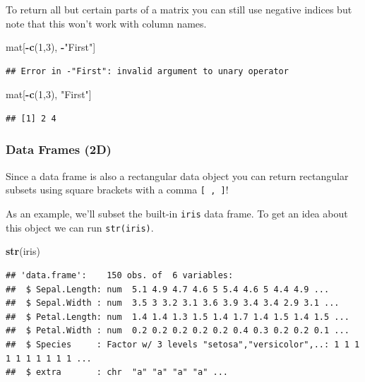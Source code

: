 \documentclass[
]{book}
\newenvironment{Shaded}{\begin{snugshade}}{\end{snugshade}}
\newcommand{\DecValTok}[1]{\textcolor[rgb]{0.00,0.00,0.81}{#1}}
\newcommand{\KeywordTok}[1]{\textcolor[rgb]{0.13,0.29,0.53}{\textbf{#1}}}
\newcommand{\NormalTok}[1]{#1}
\newcommand{\OperatorTok}[1]{\textcolor[rgb]{0.81,0.36,0.00}{\textbf{#1}}}
\newcommand{\StringTok}[1]{\textcolor[rgb]{0.31,0.60,0.02}{#1}}
\theoremstyle{definition}
\theoremstyle{definition}
\theoremstyle{definition}
\theoremstyle{remark}
\begin{document}
To return all but certain parts of a matrix you can still use negative indices but note that this won't work with column names.

\begin{Shaded}
\begin{Highlighting}[]
\NormalTok{mat[}\OperatorTok{-}\KeywordTok{c}\NormalTok{(}\DecValTok{1}\NormalTok{,}\DecValTok{3}\NormalTok{), }\OperatorTok{-}\StringTok{"First"}\NormalTok{]}
\end{Highlighting}
\end{Shaded}

\begin{verbatim}
## Error in -"First": invalid argument to unary operator
\end{verbatim}

\begin{Shaded}
\begin{Highlighting}[]
\NormalTok{mat[}\OperatorTok{-}\KeywordTok{c}\NormalTok{(}\DecValTok{1}\NormalTok{,}\DecValTok{3}\NormalTok{), }\StringTok{"First"}\NormalTok{]}
\end{Highlighting}
\end{Shaded}

\begin{verbatim}
## [1] 2 4
\end{verbatim}

\hypertarget{data-frames-2d-1}{%
\subsubsection{Data Frames (2D)}\label{data-frames-2d-1}}

Since a data frame is also a rectangular data object you can return rectangular subsets using square brackets with a comma \texttt{{[}\ ,\ {]}}!

As an example, we'll subset the built-in \texttt{iris} data frame. To get an idea about this object we can run \texttt{str(iris)}.

\begin{Shaded}
\begin{Highlighting}[]
\KeywordTok{str}\NormalTok{(iris)}
\end{Highlighting}
\end{Shaded}

\begin{verbatim}
## 'data.frame':    150 obs. of  6 variables:
##  $ Sepal.Length: num  5.1 4.9 4.7 4.6 5 5.4 4.6 5 4.4 4.9 ...
##  $ Sepal.Width : num  3.5 3 3.2 3.1 3.6 3.9 3.4 3.4 2.9 3.1 ...
##  $ Petal.Length: num  1.4 1.4 1.3 1.5 1.4 1.7 1.4 1.5 1.4 1.5 ...
##  $ Petal.Width : num  0.2 0.2 0.2 0.2 0.2 0.4 0.3 0.2 0.2 0.1 ...
##  $ Species     : Factor w/ 3 levels "setosa","versicolor",..: 1 1 1 1 1 1 1 1 1 1 ...
##  $ extra       : chr  "a" "a" "a" "a" ...
\end{verbatim}
\end{document}
